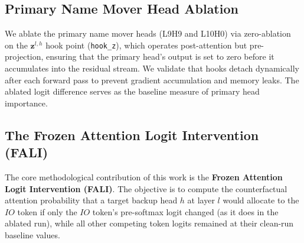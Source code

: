 \documentclass[12pt,a4paper]{article}
\begin{document}
\subsection{Primary Name Mover Head Ablation}
\label{subsec:ablation}

We ablate the primary name mover heads (L9H9 and L10H0) via zero-ablation on
the $\mathbf{z}^{l,h}$ hook point (\texttt{hook\_z}), which operates post-attention
but pre-projection, ensuring that the primary head's output is set to zero before
it accumulates into the residual stream. We validate that hooks detach
dynamically after each forward pass to prevent gradient accumulation and memory
leaks. The ablated logit difference serves as the baseline measure of primary
head importance.

\subsection{The Frozen Attention Logit Intervention (FALI)}
\label{subsec:fali}

The core methodological contribution of this work is the \textbf{Frozen Attention
Logit Intervention (FALI)}. The objective is to compute the counterfactual
attention probability that a target backup head $h$ at layer $l$ would allocate
to the $IO$ token if only the $IO$ token's pre-softmax logit changed (as it does
in the ablated run), while all other competing token logits remained at their
clean-run baseline values.
\end{document}
